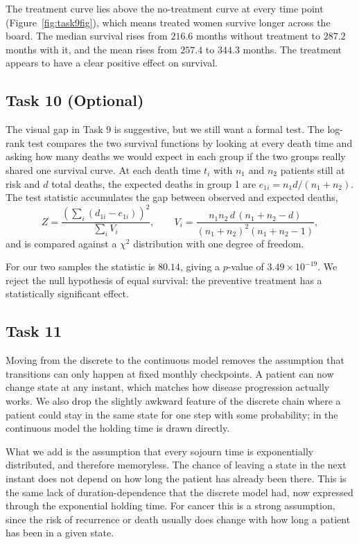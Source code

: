 The treatment curve lies above the no-treatment curve at every time point
(Figure~\ref{fig:task9fig}), which means treated women survive longer across
the board. The median survival rises from $216.6$ months without treatment to
$287.2$ months with it, and the mean rises from $257.4$ to $344.3$ months. The
treatment appears to have a clear positive effect on survival.

\subsection{Task 10 (Optional)}

The visual gap in Task 9 is suggestive, but we still want a formal test. The
log-rank test compares the two survival functions by looking at every death
time and asking how many deaths we would expect in each group if the two
groups really shared one survival curve. At each death time $t_i$ with $n_1$
and $n_2$ patients still at risk and $d$ total deaths, the expected deaths in
group 1 are $e_{1i} = n_1 d / (n_1 + n_2)$. The test statistic accumulates the
gap between observed and expected deaths,
\[
    Z = \frac{\left(\sum_i (d_{1i} - e_{1i})\right)^2}{\sum_i V_i},
    \qquad
    V_i = \frac{n_1 n_2\, d\, (n_1 + n_2 - d)}{(n_1 + n_2)^2 (n_1 + n_2 - 1)},
\]
and is compared against a $\chi^2$ distribution with one degree of freedom.

For our two samples the statistic is $80.14$, giving a $p$-value of
$3.49\times10^{-19}$. We reject the null hypothesis of equal survival: the
preventive treatment has a statistically significant effect.

\subsection{Task 11}

Moving from the discrete to the continuous model removes the assumption that
transitions can only happen at fixed monthly checkpoints. A patient can now
change state at any instant, which matches how disease progression actually
works. We also drop the slightly awkward feature of the discrete chain where a
patient could stay in the same state for one step with some probability; in the
continuous model the holding time is drawn directly.

What we add is the assumption that every sojourn time is exponentially
distributed, and therefore memoryless. The chance of leaving a state in the
next instant does not depend on how long the patient has already been there.
This is the same lack of duration-dependence that the discrete model had, now
expressed through the exponential holding time. For cancer this is a strong
assumption, since the risk of recurrence or death usually does change with how
long a patient has been in a given state.

